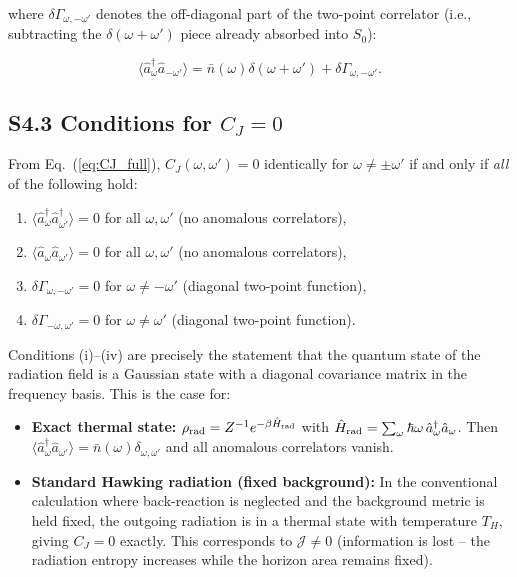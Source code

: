 \documentclass[prd,aps,showpacs,superscriptaddress,twocolumn]{revtex4-2}
\begin{document}
where $\delta\Gamma_{\omega,-\omega'}$ denotes the off-diagonal part of the two-point correlator (i.e., subtracting the $\delta(\omega+\omega')$ piece already absorbed into $S_0$):

\begin{equation}
\langle \hat{a}_\omega^\dagger \hat{a}_{-\omega'} \rangle = \bar{n}(\omega) \delta(\omega+\omega') + \delta\Gamma_{\omega,-\omega'}.
\label{eq:Gamma_decomp}
\end{equation}

\subsection{S4.3 Conditions for $C_J = 0$}

From Eq.~(\ref{eq:CJ_full}), $C_J(\omega,\omega') = 0$ identically for $\omega \neq \pm\omega'$ if and only if \emph{all} of the following hold:

\begin{enumerate}
    \item[(i)] $\langle \hat{a}_\omega^\dagger \hat{a}_{\omega'}^\dagger \rangle = 0$ for all $\omega, \omega'$ (no anomalous correlators),
    \item[(ii)] $\langle \hat{a}_\omega \hat{a}_{\omega'} \rangle = 0$ for all $\omega, \omega'$ (no anomalous correlators),
    \item[(iii)] $\delta\Gamma_{\omega,-\omega'} = 0$ for $\omega \neq -\omega'$ (diagonal two-point function),
    \item[(iv)] $\delta\Gamma_{-\omega,\omega'} = 0$ for $\omega \neq \omega'$ (diagonal two-point function).
\end{enumerate}

Conditions (i)--(iv) are precisely the statement that the quantum state of the radiation field is a Gaussian state with a diagonal covariance matrix in the frequency basis. This is the case for:

\begin{itemize}
    \item \textbf{Exact thermal state:} $\rho_{\rm rad} = Z^{-1} e^{-\beta \hat{H}_{\rm rad}}$ with $\hat{H}_{\rm rad} = \sum_\omega \hbar\omega \, \hat{a}_\omega^\dagger \hat{a}_\omega$. Then $\langle \hat{a}_\omega^\dagger \hat{a}_{\omega'} \rangle = \bar{n}(\omega) \delta_{\omega,\omega'}$ and all anomalous correlators vanish.
    \item \textbf{Standard Hawking radiation (fixed background):} In the conventional calculation where back-reaction is neglected and the background metric is held fixed, the outgoing radiation is in a thermal state with temperature $T_H$, giving $C_J = 0$ exactly. This corresponds to $\mathcal{J} \neq 0$ (information is lost -- the radiation entropy increases while the horizon area remains fixed).
\end{itemize}
\end{document}
